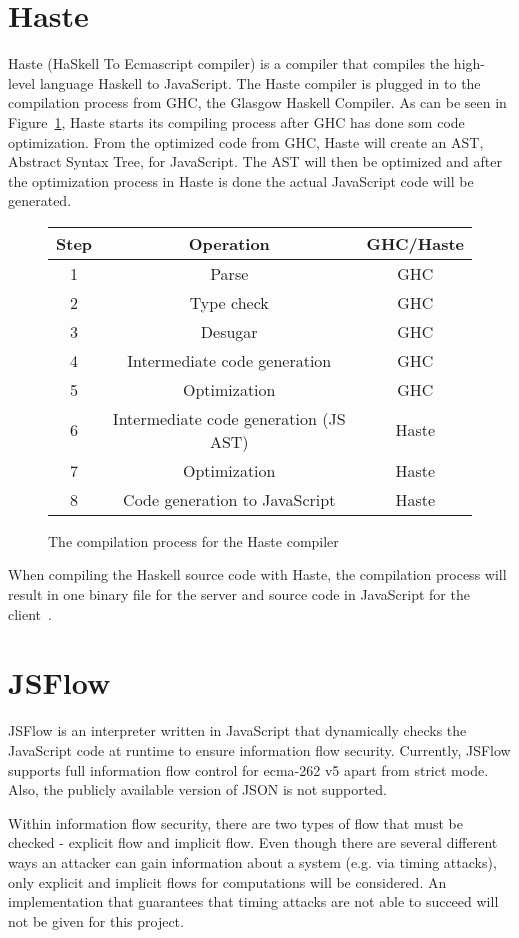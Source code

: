 \section{Haste}
Haste (HaSkell To Ecmascript compiler) is a compiler that compiles the high-level language Haskell to JavaScript. The Haste compiler is plugged in to the compilation process from GHC, the Glasgow Haskell Compiler. As can be seen in Figure~\ref{fig:system}, Haste starts its compiling process after GHC has done som code optimization. From the optimized code from GHC, Haste will create an AST, Abstract Syntax Tree, for JavaScript. The AST will then be optimized and after the optimization process in Haste is done the actual JavaScript code will be generated.
\begin{figure}[h]
  \begin{tabular}{|c|c|c|}
    \hline
    Step & Operation & GHC/Haste \\
    \hline
    1 & Parse & GHC \\
    2 & Type check & GHC \\
    3 & Desugar & GHC \\
    4 & Intermediate code generation & GHC \\
    5 & Optimization & GHC \\
    6 & Intermediate code generation (JS AST) & Haste \\
    7 & Optimization & Haste \\
    8 & Code generation to JavaScript & Haste \\
    \hline
  \end{tabular}
  \caption{The compilation process for the Haste compiler}
  \label{fig:system}
\end{figure}

When compiling the Haskell source code with Haste, the compilation process will result in one binary file for the server and source code in JavaScript for the client~\cite{haste-symposium}.

\section{JSFlow}
JSFlow is an interpreter written in JavaScript that dynamically checks the JavaScript code at runtime to ensure information flow security. Currently, JSFlow supports full information flow control for ecma-262 v5 apart from strict mode. Also, the publicly available version of JSON is not supported.

Within information flow security, there are two types of flow that must be checked - explicit flow and implicit flow. Even though there are several different ways an attacker can gain information about a system (e.g. via timing attacks), only explicit and implicit flows for computations will be considered. An implementation that guarantees that timing attacks are not able to succeed will not be given for this project.

